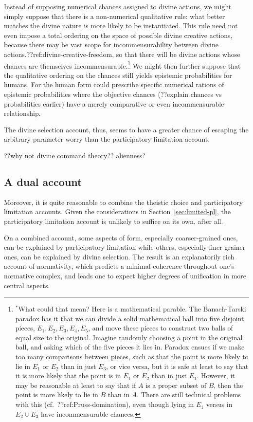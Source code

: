 Instead of supposing numerical chances assigned to divine actions, we might simply suppose that there is a non-numerical qualitative 
rule: what better matches the divine nature is more likely to be instantiated. This rule need not even impose a total ordering on the
space of possible divine creative actions, because there may be vast scope for incommensurability between divine actions.??ref:divine-creative-freedom,
so that there will be divine actions whose chances are themselves incommensurable.\footnote{$^*$What could that mean? Here is a mathematical
parable. The Banach-Tarski paradox has it that we can divide a solid mathematical ball into five disjoint pieces, $E_1,E_2,E_3,E_4,E_5$, and move these pieces to 
construct two balls of equal size to the original. Imagine randomly choosing a point in the original ball, and asking which of the
five pieces it lies in. Paradox ensues if we make too many comparisons between pieces, such as that the point is more likely to lie in 
$E_1$ or $E_2$ than in just $E_3$, or vice versa, but it is safe at least to say that it is more likely that the point is in $E_1$ or $E_2$
than in just $E_1$. However, it may be reasonable at least to say that if $A$ is a proper subset of $B$, then the point is more likely to lie in $B$ than
in $A$. There are still technical problems with this (cf.\ ??ref:Pruss-domination), even though lying in $E_1$ versus in $E_2\cup E_3$ have
incommensurable chances.} We might then further suppose that the qualitative ordering on the chances still yields epistemic probabilities for humans. For
the human form could prescribe specific numerical rations of epistemic probabilities where the objective chances (??explain chances vs probabilities earlier) 
have a merely comparative or even incommensurable relationship.

The divine selection account, thus, seems to have a greater chance of escaping the arbitrary parameter worry than the 
participatory limitation account.

??why not divine command theory?? alienness?

\subsection{A dual account}
Moreover, it is quite reasonable to combine the theistic choice and participatory limitation accounts. Given the considerations in 
Section~\ref{sec:limited-pl}, the participatory limitation account is unlikely to suffice on its own, after all.

On a combined account, some aspects of form, especially coarser-grained ones, can be explained by participatory 
limitation while others, especially finer-grainer ones, can be explained by divine selection. The result is an explanatorily rich account of 
normativity, which predicts a minimal coherence throughout one's normative complex, and leads one to expect higher degrees of unification
in more central aspects.

